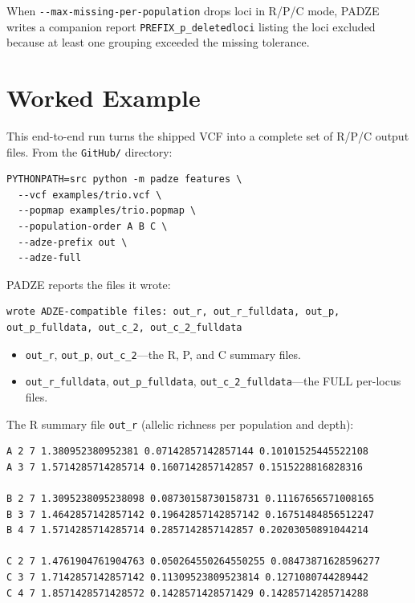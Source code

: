 \documentclass[11pt]{article}
\newcommand{\padze}{PADZE}
\begin{document}
When \texttt{-{}-max-missing-per-population} drops loci in R/P/C mode, \padze{}
writes a companion report \texttt{PREFIX\_p\_deletedloci} listing the loci
excluded because at least one grouping exceeded the missing tolerance.

\section{Worked Example}
\label{sec:example}

This end-to-end run turns the shipped VCF into a complete set of R/P/C output
files. From the \texttt{GitHub/} directory:
\begin{lstlisting}[style=cmd]
PYTHONPATH=src python -m padze features \
  --vcf examples/trio.vcf \
  --popmap examples/trio.popmap \
  --population-order A B C \
  --adze-prefix out \
  --adze-full
\end{lstlisting}

\padze{} reports the files it wrote:
\begin{lstlisting}[style=out]
wrote ADZE-compatible files: out_r, out_r_fulldata, out_p, out_p_fulldata, out_c_2, out_c_2_fulldata
\end{lstlisting}
\begin{itemize}
  \item \texttt{out\_r}, \texttt{out\_p}, \texttt{out\_c\_2}---the R, P, and C
        summary files.
  \item \texttt{out\_r\_fulldata}, \texttt{out\_p\_fulldata},
        \texttt{out\_c\_2\_fulldata}---the FULL per-locus files.
\end{itemize}

The R summary file \texttt{out\_r} (allelic richness per population and depth):
\begin{lstlisting}[style=out]
A 2 7 1.380952380952381 0.07142857142857144 0.10101525445522108
A 3 7 1.5714285714285714 0.1607142857142857 0.1515228816828316

B 2 7 1.3095238095238098 0.08730158730158731 0.11167656571008165
B 3 7 1.4642857142857142 0.19642857142857142 0.16751484856512247
B 4 7 1.5714285714285714 0.2857142857142857 0.20203050891044214

C 2 7 1.4761904761904763 0.050264550264550255 0.08473871628596277
C 3 7 1.7142857142857142 0.11309523809523814 0.1271080744289442
C 4 7 1.8571428571428572 0.1428571428571429 0.14285714285714288
\end{lstlisting}
\end{document}
